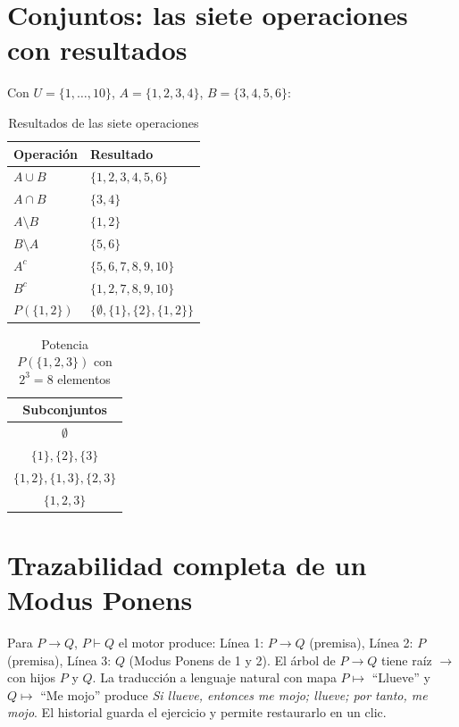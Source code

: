 \documentclass[11pt,a4paper,openany]{book}
\begin{document}
\chapter{Conjuntos: las siete operaciones con resultados}
\label{ch:conj-siete}
Con $U = \{1,\ldots,10\}$, $A = \{1,2,3,4\}$, $B = \{3,4,5,6\}$:
\begin{table}[H]
\centering
\caption{Resultados de las siete operaciones}
\begin{tabular}{ll}
\toprule
Operaci\'on & Resultado \\
\midrule
$A \cup B$ & $\{1,2,3,4,5,6\}$ \\
$A \cap B$ & $\{3,4\}$ \\
$A \setminus B$ & $\{1,2\}$ \\
$B \setminus A$ & $\{5,6\}$ \\
$A^{c}$ & $\{5,6,7,8,9,10\}$ \\
$B^{c}$ & $\{1,2,7,8,9,10\}$ \\
$P(\{1,2\})$ & $\{\emptyset,\{1\},\{2\},\{1,2\}\}$ \\
\bottomrule
\end{tabular}
\end{table}

\begin{table}[H]
\centering
\caption{Potencia $P(\{1,2,3\})$ con $2^{3} = 8$ elementos}
\begin{tabular}{c}
\toprule
Subconjuntos \\
\midrule
$\emptyset$ \\
$\{1\}, \{2\}, \{3\}$ \\
$\{1,2\}, \{1,3\}, \{2,3\}$ \\
$\{1,2,3\}$ \\
\bottomrule
\end{tabular}
\end{table}

\chapter{Trazabilidad completa de un Modus Ponens}
\label{ch:mp-full}
Para $P \to Q$, $P \vdash Q$ el motor produce: L\'inea 1: $P \to Q$ (premisa), L\'inea 2: $P$ (premisa), L\'inea 3: $Q$ (Modus Ponens de 1 y 2). El \'arbol de $P \to Q$ tiene ra\'iz $\to$ con hijos $P$ y $Q$. La traducci\'on a lenguaje natural con mapa $P \mapsto$ ``Llueve'' y $Q \mapsto$ ``Me mojo'' produce \textit{Si llueve, entonces me mojo; llueve; por tanto, me mojo}. El historial guarda el ejercicio y permite restaurarlo en un clic.
\end{document}
